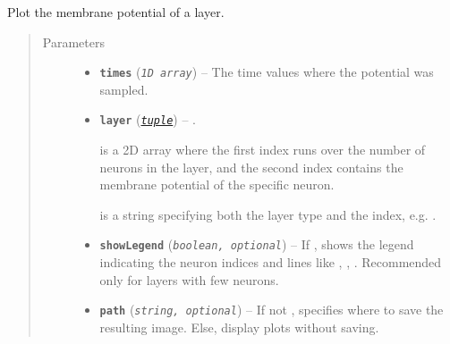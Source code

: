 \documentclass[letterpaper,10pt,english]{sphinxmanual}
\begin{document}
\begin{fulllineitems}
\label{snntoolbox.io_utils:snntoolbox.io_utils.plotting.plot_potential}
Plot the membrane potential of a layer.
\begin{quote}\begin{description}
\item[{Parameters}] \leavevmode\begin{itemize}
\item {} 
\textbf{\texttt{times}} (\emph{\texttt{1D array}}) -- The time values where the potential was sampled.

\item {} 
\textbf{\texttt{layer}} (\href{https://docs.python.org/library/functions.html\#tuple}{\emph{\texttt{tuple}}}) -- 
.

 is a 2D array where the first index runs over the number of
neurons in the layer, and the second index contains the membrane
potential of the specific neuron.

 is a string specifying both the layer type and the index,
e.g. .


\item {} 
\textbf{\texttt{showLegend}} (\emph{\texttt{boolean, optional}}) -- If , shows the legend indicating the neuron indices and lines
like , , . Recommended only for layers
with few neurons.

\item {} 
\textbf{\texttt{path}} (\emph{\texttt{string, optional}}) -- If not , specifies where to save the resulting image. Else,
display plots without saving.

\end{itemize}

\end{description}\end{quote}

\end{fulllineitems}

\end{document}

